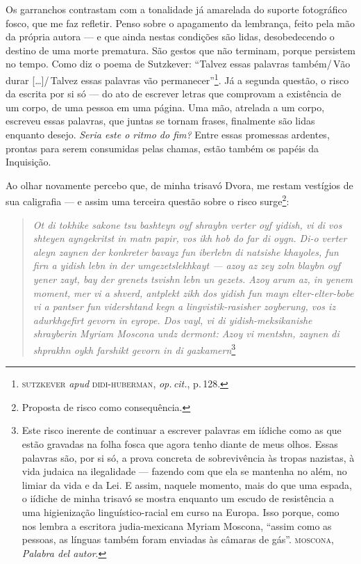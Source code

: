 Os garranchos contrastam com a tonalidade já amarelada do suporte
fotográfico fosco, que me faz refletir. Penso sobre o apagamento da
lembrança, feito pela mão da própria autora --- e que ainda nestas
condições são lidas, desobedecendo o destino de uma morte prematura. São
gestos que não terminam, porque persistem no tempo. Como diz o poema de
Sutzkever: ``Talvez essas palavras também/\,Vão durar {[}\ldots{}{]}/\,Talvez essas palavras vão permanecer''\footnote{\textsc{sutzkever}
  \emph{apud} \textsc{didi-huberman}, \emph{op.\,cit.}, p.\,128.}. Já a segunda questão, o risco
da escrita por si só --- do ato de escrever letras que comprovam a
existência de um corpo, de uma pessoa em uma página. Uma mão, atrelada a
um corpo, escreveu essas palavras, que juntas se tornam frases,
finalmente são lidas enquanto desejo. \emph{Seria este o ritmo do fim?}
Entre essas promessas ardentes, prontas para serem consumidas pelas
chamas, estão também os papéis da Inquisição.

Ao olhar novamente percebo que, de minha trisavó Dvora, me restam
vestígios de sua caligrafia --- e assim uma terceira questão sobre o
risco surge\footnote{Proposta de risco como consequência.}:


\begin{quote}
\emph{Ot di tokhike sakone tsu bashteyn oyf shraybn verter oyf yidish, vi di
vos shteyen ayngekritst in matn papir, vos ikh hob do far di oygn. Di-o
verter aleyn zaynen der konkreter bavayz fun iberlebn di natsishe
khayoles, fun firn a yidish lebn in der umgezetslekhkayt --- azoy az zey
zoln blaybn oyf yener zayt, bay der grenets tsvishn lebn un gezets. Azoy
arum az, in yenem moment, mer vi a shverd, antplekt zikh dos yidish fun
mayn elter-elter-bobe vi a pantser fun vidershtand kegn a
lingvistik-rasisher zoyberung, vos iz adurkhgefirt gevorn in eyrope. Dos
vayl, vi di yidish-meksikanishe shrayberin Myriam Moscona undz dermont:
\emph{Azoy vi mentshn, zaynen di shprakhn oykh farshikt gevorn in di
gazkamern}}\footnote{Este risco inerente de continuar a escrever
  palavras em iídiche como as que estão gravadas na folha fosca
  que agora tenho diante de meus olhos. Essas palavras são, por si só, a
  prova concreta de sobrevivência às tropas nazistas, à vida judaica na
  ilegalidade --- fazendo com que ela se mantenha no além, no limiar da
  vida e da Lei. E assim, naquele momento, mais do que uma espada, o
  iídiche de minha trisavó se mostra enquanto um escudo de
  resistência a uma higienização linguístico-racial em curso na Europa.
  Isso porque, como nos lembra a escritora judia-mexicana Myriam
  Moscona, ``assim como as pessoas, as línguas também foram
  enviadas às câmaras de gás''. \textsc{moscona}, \emph{Palabra del autor}.}
\end{quote}

